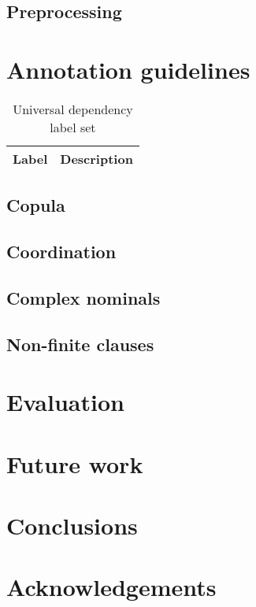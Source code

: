 \documentclass[a4paper,11pt, onecolumn]{article}
\begin{document}
\subsection{Preprocessing}

\cite{Washington14}


\section{Annotation guidelines}

\begin{table}
  \centering
  \begin{tabular}{|l|l|}
    \hline
    \textbf{Label} & \textbf{Description} \\

    \hline
  \end{tabular}
  \caption{Universal dependency label set}
\end{table}

\subsection{Copula}

\subsection{Coordination}

\subsection{Complex nominals}


\subsection{Non-finite clauses}

\section{Evaluation}

\section{Future work}



\section{Conclusions}

\section*{Acknowledgements}



\end{document}
